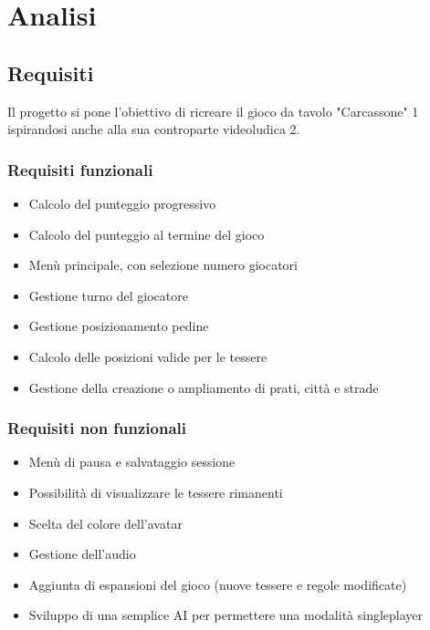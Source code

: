 \section{Analisi}
\subsection{Requisiti}
Il progetto si pone l'obiettivo di ricreare il gioco da tavolo "Carcassone" 1 ispirandosi anche alla sua controparte videoludica 2. 

\subsubsection{Requisiti funzionali}
\begin{itemize}
\item Calcolo del punteggio progressivo
\item Calcolo del punteggio al termine del gioco
\item Menù principale, con selezione numero giocatori
\item Gestione turno del giocatore
\item Gestione posizionamento pedine
\item Calcolo delle posizioni valide per le tessere
\item Gestione della creazione o ampliamento di prati, città e strade
\end{itemize}

\subsubsection{Requisiti non funzionali}
\begin{itemize}
\item Menù di pausa e salvataggio sessione
\item Possibilità di visualizzare le tessere rimanenti
\item Scelta del colore dell’avatar
\item Gestione dell’audio
\item Aggiunta di espansioni del gioco (nuove tessere e regole modificate)
\item Sviluppo di una semplice AI per permettere una modalità singleplayer
\end{itemize}

